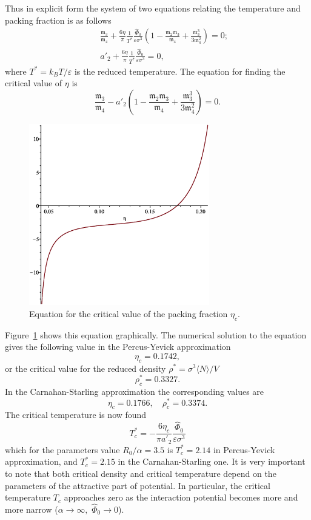 Thus in explicit form the system of two equations relating the temperature and packing fraction is as follows
\begin{eqnarray}
	&&\frac{\mathfrak{m}_3}{\mathfrak{m}_4} + \frac{6\eta}{\pi} \frac{1}{T^*} \frac{\hat{\Phi}_0}{\varepsilon\sigma^3}
	\left(1 - \frac{\mathfrak{m}_2\mathfrak{m}_3}{\mathfrak{m}_4} + \frac{\mathfrak{m}_3^3}{3\mathfrak{m}_4^2} \right) = 0;
	\nonumber\\
	&& a'_2 + \frac{6\eta}{\pi} \frac{1}{T^*} \frac{\hat{\Phi}_0}{\varepsilon\sigma^3} = 0,
\end{eqnarray}
where $T^* = k_BT/\varepsilon$ is the reduced temperature.
The equation for finding the critical value of $\eta$ is 
\begin{equation}
	\frac{\mathfrak{m}_3}{\mathfrak{m}_4} - a'_2
	\left(1 - \frac{\mathfrak{m}_2\mathfrak{m}_3}{\mathfrak{m}_4} + \frac{\mathfrak{m}_3^3}{3\mathfrak{m}_4^2} \right) = 0.
\end{equation}
\begin{figure}[htbp]
	\includegraphics[width=0.7\textwidth,angle=0]{equation_for_critical_density}
	\caption{Equation for the critical value of the packing fraction $\eta_c$.}
	\label{eq_for_eta_c}
\end{figure}
Figure~\ref{eq_for_eta_c} shows this equation graphically. The numerical solution to the equation gives the following value in the Percus-Yevick approximation
$$
\eta_c = 0.1742,
$$
or the critical value for the reduced density $\rho^* = \sigma^3\langle N \rangle / V$
$$
\rho^*_c = 0.3327.
$$
In the Carnahan-Starling approximation the corresponding values are
\begin{equation}
	\eta_c = 0.1766, \quad \rho^*_c = 0.3374.
\end{equation}
The critical temperature is now found
$$
T^*_c = -\frac{6\eta_c}{\pi a'_2} \frac{\hat{\Phi}_0}{\varepsilon\sigma^3}
$$
which for the parameters value $R_0/\alpha = 3.5$ is $T^*_c=2.14$ in Percus-Yevick approximation, and $T^*_c=2.15$ in the Carnahan-Starling one.
It is very important to note that both critical density and critical temperature depend on the parameters of the attractive part of potential. In particular, the critical temperature $T_c$ approaches zero as the interaction potential becomes more and more narrow ($\alpha \to \infty,$ $\hat{\Phi}_0 \to 0$).

